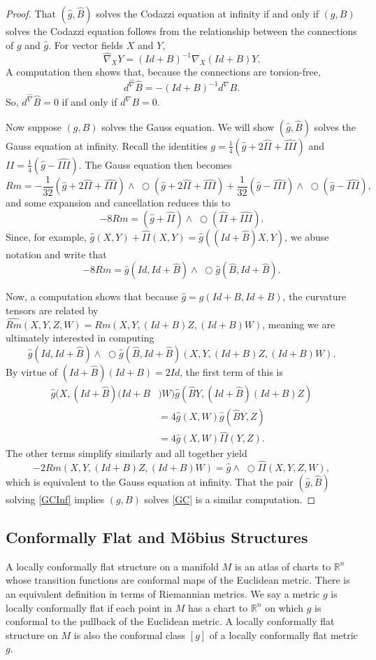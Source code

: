 \documentclass{amsart}
\newcommand{\R}{\mathbb{R}}
\newcommand{\two}{I\!\!I}
\newcommand{\three}{I\!\!I\!\!I}
\newcommand{\wtimes}{\wedge \!\!\!\!\!\!\!\!\;\bigcirc}
\begin{document}
\begin{proof}
That $(\hat{g},\hat{B})$ solves the Codazzi equation at infinity if and only if $(g,B)$ solves the Codazzi equation follows from the relationship between the connections of $g$ and $\hat{g}$. 
For vector fields $X$ and $Y$,
\[
\hat{\nabla}_XY = (Id+B)^{-1}\nabla_X(Id+B)Y.
\]
A computation then shows that, because the connections are torsion-free,
\[
d^{\hat{\nabla}}\hat{B} = -(Id+B)^{-1}d^\nabla B.
\]
So, $d^{\hat{\nabla}}\hat{B} = 0$ if and only if $d^\nabla B = 0$.

Now suppose $(g,B)$ solves the Gauss equation. 
We will show $(\hat{g},\hat{B})$ solves the Gauss equation at infinity. 
Recall the identities $g = \frac{1}{4}(\hat{g} + 2 \hat{\two} + \hat{\three})$ and $\two = \frac{1}{4}(\hat{g} - \hat{\three})$.
The Gauss equation then becomes 
\[
Rm = -\frac{1}{32}(\hat{g} + 2 \hat{\two} + \hat{\three})\wtimes(\hat{g} + 2 \hat{\two} + \hat{\three}) + \frac{1}{32}(\hat{g} - \hat{\three})\wtimes(\hat{g} - \hat{\three}),
\]
and some expansion and cancellation reduces this to 
\[
-8Rm = (\hat{g} + \hat{\two})\wtimes (\hat{\two} + \hat{\three}).
\]
Since, for example, $\hat{g}(X,Y) + \hat{\two}(X,Y) = \hat{g}((Id + \hat{B})X,Y)$, we abuse notation and write that
\[
-8Rm = \hat{g}(Id, Id + \hat{B})\wtimes \hat{g}(\hat{B}, Id + \hat{B}).
\]

Now, a computation shows that because $\hat{g} = g(Id + B, Id + B)$, the curvature tensors are related by $\hat{Rm}(X,Y,Z,W) = Rm(X,Y,(Id+B)Z,(Id+B)W)$, meaning we are ultimately interested in computing
\[
\hat{g}(Id, Id + \hat{B})\wtimes \hat{g}(\hat{B}, Id + \hat{B})(X,Y,(Id+B)Z,(Id+B)W).
\]
By virtue of $(Id + \hat{B})(Id+B) = 2 Id$, the first term of this is 
\begin{align*}
\hat{g}(X,(Id + \hat{B})(Id+B&)W)\hat{g}(\hat{B}Y,(Id + \hat{B})(Id+B)Z) \\
&= 4\hat{g}(X,W)\hat{g}(\hat{B}Y,Z) \\
&= 4 \hat{g}(X,W)\hat{\two}(Y,Z).
\end{align*}
The other terms simplify similarly and all together yield 
\[
-2Rm(X,Y,(Id+B)Z,(Id+B)W) = \hat{g}\wtimes\hat{\two}(X,Y,Z,W),
\]
which is equivalent to the Gauss equation at infinity.
That the pair $(\hat{g},\hat{B})$ solving \ref{GCInf} implies $(g,B)$ solves \ref{GC} is a similar computation.
\end{proof}


\subsection{Conformally Flat and M\"obius Structures}
A locally conformally flat structure on a manifold $M$ is an atlas of charts to $\R^n$ whose transition functions are conformal maps of the Euclidean metric.
There is an equivalent definition in terms of Riemannian metrics.
We say a metric $g$ is locally conformally flat if each point in $M$ has a chart to $\R^n$ on which $g$ is conformal to the pullback of the Euclidean metric.
A locally conformally flat structure on $M$ is also the conformal class $[g]$ of a locally conformally flat metric $g$.
\end{document}
